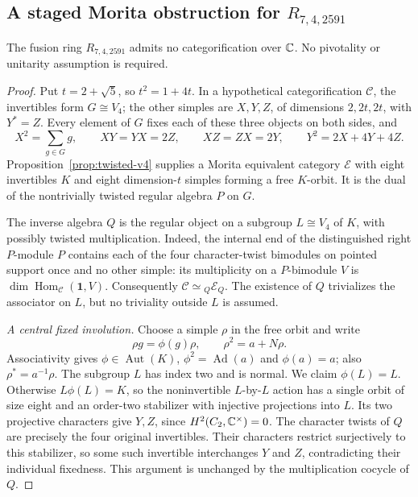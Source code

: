 \subsection{A staged Morita obstruction for \texorpdfstring{$R_{7,4,2591}$}{R7-4-2591}}
\label{sec:r2591-staged-morita}

\begin{theorem}\label{thm:r2591-staged-morita}
The fusion ring $R_{7,4,2591}$ admits no categorification over $\mathbb C$.
No pivotality or unitarity assumption is required.
\end{theorem}

\begin{proof}
Put $t=2+\sqrt5$, so $t^2=1+4t$.  In a hypothetical
categorification $\mathcal C$, the invertibles form $G\cong V_4$;
the other simples are $X,Y,Z$, of dimensions $2,2t,2t$, with
$Y^*=Z$.  Every element of $G$ fixes each of these three objects on
both sides, and
\[
 X^2=\sum_{g\in G}g,\qquad XY=YX=2Z,\qquad
 XZ=ZX=2Y,\qquad Y^2=2X+4Y+4Z.
\]
Proposition~\ref{prop:twisted-v4} supplies a Morita equivalent category
$\mathcal E$ with eight invertibles $K$ and eight dimension-$t$
simples forming a free $K$-orbit. It is the dual of the nontrivially
twisted regular algebra $P$ on $G$.

The inverse algebra $Q$ is the regular object on a subgroup
$L\cong V_4$ of $K$, with possibly twisted multiplication.  Indeed,
the internal end of the distinguished right $P$-module $P$ contains
each of the four character-twist bimodules on pointed support once
and no other simple: its multiplicity on a $P$-bimodule $V$ is
$\dim\operatorname{Hom}_{\mathcal C}(\mathbf1,V)$.
Consequently $\mathcal C\simeq{}_Q\mathcal E_Q$.  The existence of
$Q$ trivializes the associator on $L$, but no triviality outside $L$
is assumed.

\medskip\noindent\emph{A central fixed involution.}
Choose a simple $\rho$ in the free orbit and write
\[
 \rho g=\phi(g)\rho,\qquad \rho^2=a+N\rho.
\]
Associativity gives $\phi\in\operatorname{Aut}(K)$,
$\phi^2=\operatorname{Ad}(a)$ and $\phi(a)=a$; also
$\rho^*=a^{-1}\rho$.  The subgroup $L$ has index two and is normal.
We claim $\phi(L)=L$.  Otherwise $L\phi(L)=K$, so the noninvertible
$L$-by-$L$ action has a single orbit of size eight and an order-two
stabilizer with injective projections into $L$.  Its two projective
characters give $Y,Z$, since $H^2(C_2,\mathbb C^\times)=0$.
The character twists of $Q$ are precisely the four original
invertibles.  Their characters restrict surjectively to this
stabilizer, so some such invertible interchanges $Y$ and $Z$,
contradicting their individual fixedness.  This argument is unchanged
by the multiplication cocycle of $Q$.


\end{proof}
